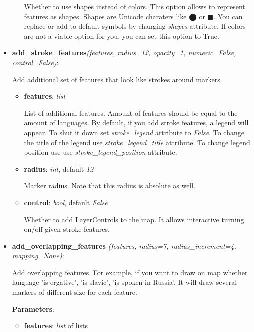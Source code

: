 \documentclass[a4paper,12pt]{article}
\begin{document}
\begin{itemize}
\begin{itemize}
  Whether to use shapes instead of colors. This option allows to represent features as shapes.
  Shapes are Unicode charaters like ⬤ or ◼. You can replace or add to default symbols by changing \textit{shapes} attribute.
  If colors are not a viable option for you, you can set this option to True.
  
 \end{itemize}
 
 \item \textbf{add\_stroke\_features}\textit{(features, radius=12, opacity=1, numeric=False, control=False)}:
 
 Add additional set of features that look like strokes around markers.
 
 \begin{itemize}
 \item \textbf{features}: \textit{list}
 
 List of additional features. Amount of features should be equal to the amount of languages.
 By default, if you add stroke features, a legend will appear. To shut it down set \textit{stroke_legend} attribute to \textit{False}.
 To change the title of the legend use \textit{stroke\_legend\_title} attribute.
 To change legend position use use \textit{stroke\_legend\_position} attribute.
 
 \item \textbf{radius}: \textit{int}, default \textit{12}
 
 Marker radius. Note that this radius is absolute as well.
 
 \item \textbf{control}: \textit{bool}, default \textit{False}
  
  Whether to add LayerControls to the map.
  It allows interactive turning on/off given stroke features.

 \end{itemize}
 
 \item \textbf{add\_overlapping\_features} \textit{(features, radius=7, radius\_increment=4, mapping=None)}:
 
 Add overlapping features.
 For example, if you want to draw on map whether language 'is ergative', 'is slavic', 'is spoken in Russia'.
 It will draw several markers of different size for each feature.
 
 \textbf{Parameters}:
 
 \begin{itemize}
 \item \textbf{features}: \textit{list} of lists
 

\end{itemize}
\end{itemize}
\end{document}
